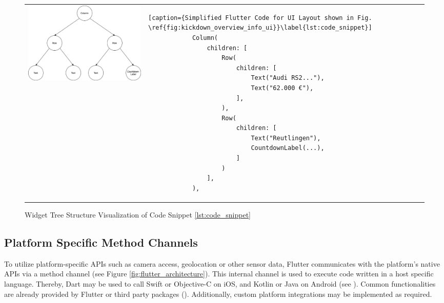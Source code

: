 \begin{figure}[htbp]
    \begin{tabular}{p{}p{}}
        \begin{minipage}{.5\textwidth}
        \centering
        \includegraphics[width=\linewidth]{images/Kickdown_overview_info_ui_tree.eps}
        \caption{Widget Tree Structure Visualization of Code Snippet \ref{lst:code_snippet}}
        \label{fig:kickdown_overview_info_ui_tree}
        \end{minipage}
        &
        \begin{minipage}{.5\textwidth}
            \begin{lstlisting}[caption={Simplified Flutter Code for UI Layout shown in Fig. \ref{fig:kickdown_overview_info_ui}}\label{lst:code_snippet}]
            Column(
                children: [
                    Row(
                        children: [
                            Text("Audi RS2..."),
                            Text("62.000 €"),
                        ],
                    ),
                    Row(
                        children: [
                            Text("Reutlingen"),
                            CountdownLabel(...),
                        ]
                    )
                ],
            ),
            \end{lstlisting}
        \end{minipage}
    \end{tabular}
\end{figure}

\subsection{Platform Specific Method Channels} \label{subsection::method_channels}
To utilize platform-specific APIs such as camera access, geolocation or other sensor data, Flutter communicates with the platform's native APIs via 
a method channel (see Figure \ref{fig:flutter_architecture}). 
This internal channel is used to execute code written in a host specific language. Thereby, Dart may be used to call Swift or Objective-C on iOS, and Kotlin or Java on Android (see \cite{PlatformChannel2021}).
Common functionalities are already provided by Flutter or third party packages (\cite{PubDev2021}). Additionally, custom platform integrations may be 
implemented as required.

